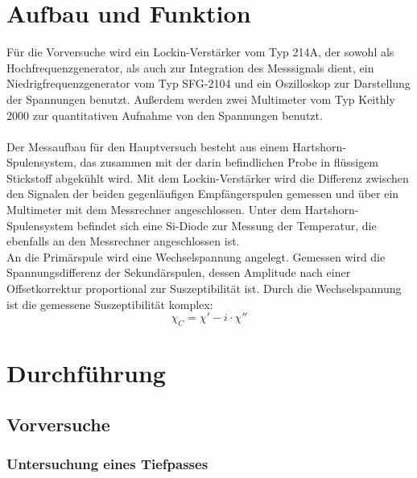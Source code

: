 \documentclass[12pt,a4paper]{article}
\begin{document}
\section{Aufbau und Funktion}
Für die Vorversuche wird ein Lockin-Verstärker vom Typ 214A, der sowohl als Hochfrequenzgenerator, als auch zur Integration des Messsignals dient, ein Niedrigfrequenzgenerator vom Typ SFG-2104 und ein Oszilloskop zur Darstellung der Spannungen benutzt. Außerdem werden zwei Multimeter vom Typ Keithly 2000 zur quantitativen Aufnahme von den Spannungen benutzt.\\
\\
Der Messaufbau für den Hauptversuch besteht aus einem Hartshorn-Spulensystem, das zusammen mit der darin befindlichen Probe in flüssigem Stickstoff abgekühlt wird. Mit dem Lockin-Verstärker wird die Differenz zwischen den Signalen der beiden gegenläufigen Empfängerspulen gemessen und über ein Multimeter mit dem Messrechner angeschlossen. Unter dem Hartshorn-Spulensystem befindet sich eine Si-Diode zur Messung der Temperatur, die ebenfalls an den Messrechner angeschlossen ist.\\
An die Primärspule wird eine Wechselspannung angelegt. Gemessen wird die Spannungsdifferenz der Sekundärspulen, dessen Amplitude nach einer Offsetkorrektur proportional zur Suszeptibilität ist. Durch die Wechselspannung ist die gemessene Suszeptibilität komplex:
\begin{equation}
\chi_C = \chi' - i\cdot \chi''
\end{equation}


\section{Durchführung}
\subsection{Vorversuche}
\subsubsection{Untersuchung eines Tiefpasses}
\end{document}
